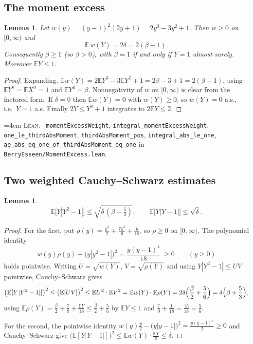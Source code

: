 \documentclass[10pt,a4paper]{article}
\theoremstyle{plain}
\newtheorem{lemma}[theorem]{Lemma}
\theoremstyle{definition}
\newcommand{\E}{\mathbb{E}}
\newcommand{\lean}[1]{\texttt{#1}}
\newcommand{\file}[1]{\texttt{#1}}
\newenvironment{leanref}%
  {\par\addvspace{3pt}\begingroup\sloppy\emergencystretch=4em
   \noindent\footnotesize\textsc{Lean.}\ \ignorespaces}%
  {\par\endgroup\addvspace{3pt}}
\begin{document}
\subsection{The moment excess}

\begin{lemma}\label{lem:beta-ge-one}
Let $w(y)=(y-1)^2(2y+1)=2y^3-3y^2+1$. Then $w\ge0$ on $[0,\infty)$ and
\[
  \boxed{\ \E\,w(Y) = 2\delta = 2(\beta-1).\ }
\]
Consequently $\beta\ge1$ (so $\beta>0$), with $\beta=1$ if and only if
$Y=1$ almost surely. Moreover $\E Y\le1$.
\end{lemma}

\begin{proof}
Expanding, $\E w(Y)=2\E Y^3-3\E Y^2+1=2\beta-3+1=2(\beta-1)$, using
$\E Y^2=\E X^2=1$ and $\E Y^3=\beta$. Nonnegativity of $w$ on $[0,\infty)$ is
clear from the factored form. If $\delta=0$ then $\E w(Y)=0$ with $w(Y)\ge0$,
so $w(Y)=0$ a.s., i.e.\ $Y=1$ a.s. Finally $2Y\le Y^2+1$ integrates to
$2\E Y\le 2$.
\end{proof}

\begin{leanref}
\lean{momentExcessWeight}, \lean{integral\_momentExcessWeight},
\lean{one\_le\_thirdAbsMoment}, \lean{thirdAbsMoment\_pos},
\lean{integral\_abs\_le\_one},
\lean{ae\_abs\_eq\_one\_of\_thirdAbsMoment\_eq\_one} in
\file{BerryEsseen/MomentExcess.lean}.
\end{leanref}

\subsection{Two weighted Cauchy--Schwarz estimates}

\begin{lemma}\label{lem:weighted-cs}
\[
  \boxed{\ \E\bigl[Y|Y^2-1|\bigr] \le \sqrt{\delta\,(\beta+\tfrac53)},
  \qquad
  \E\bigl[Y|Y-1|\bigr] \le \sqrt{\delta}.\ }
\]
\end{lemma}

\begin{proof}
For the first, put $\rho(y)=\tfrac{y^3}{2}+\tfrac{7y^2}{9}+\tfrac{y}{18}$, so
$\rho\ge0$ on $[0,\infty)$. The polynomial identity
\[
  w(y)\rho(y) - \bigl(y|y^2-1|\bigr)^2 = \frac{y(y-1)^4}{18} \ \ge 0
  \qquad (y\ge0)
\]
holds pointwise. Writing $U=\sqrt{w(Y)}$, $V=\sqrt{\rho(Y)}$ and using
$Y|Y^2-1|\le UV$ pointwise, Cauchy--Schwarz gives
\[
  \bigl(\E[Y|Y^2-1|]\bigr)^2 \le \bigl(\E[UV]\bigr)^2
  \le \E U^2\cdot\E V^2 = \E w(Y)\cdot\E\rho(Y)
  = 2\delta\Bigl(\frac\beta2+\frac56\Bigr) = \delta\Bigl(\beta+\frac53\Bigr),
\]
using
$\E\rho(Y)=\tfrac\beta2+\tfrac79+\tfrac{\E Y}{18}\le\tfrac\beta2+\tfrac56$ by
$\E Y\le1$ and $\tfrac79+\tfrac1{18}=\tfrac{15}{18}=\tfrac56$.

For the second, the pointwise identity
$w(y)\tfrac y2-\bigl(y|y-1|\bigr)^2=\tfrac{y(y-1)^2}{2}\ge0$ and
Cauchy--Schwarz give
$\bigl(\E[Y|Y-1|]\bigr)^2\le\E w(Y)\cdot\tfrac{\E Y}{2}\le\delta$.
\end{proof}
\end{document}
